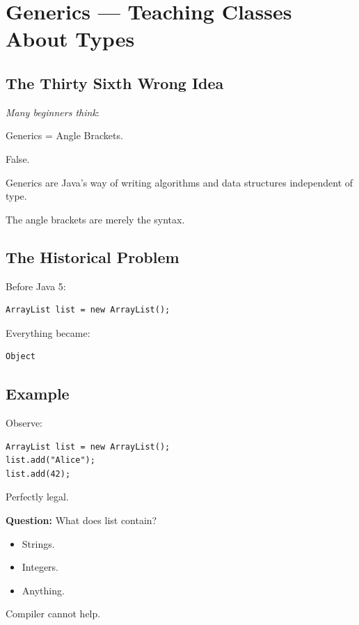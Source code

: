 \documentclass[11pt,a4paper]{book}
\newcommand{\question}[1]{
\vspace{0.5em}
\textbf{Question:} #1?
\vspace{0.2em}
}
\begin{document}
\chapter{Generics --- Teaching Classes About Types}

\section{The Thirty Sixth Wrong Idea}

\begin{trap}

\emph{Many beginners think}:

Generics
=
Angle Brackets.

\textcolor{RosettaOrange}{False}.

Generics are Java's way of
writing algorithms and data
structures independent of type.

The angle brackets are merely
the syntax.

\end{trap}

\section{The Historical Problem}

Before Java 5:

\begin{verbatim} 
ArrayList list = new ArrayList();
\end{verbatim}

Everything became:

\begin{verbatim} 
Object
\end{verbatim}

\section{Example}

Observe:

\begin{verbatim} 
ArrayList list = new ArrayList();
list.add("Alice");
list.add(42);
\end{verbatim}

Perfectly legal.

\question{What does list contain}
\begin{itemize}
\item [ ]Strings.
\item [ ]Integers.
\item [ ]Anything.
\end{itemize}
Compiler cannot help.
\end{document}
